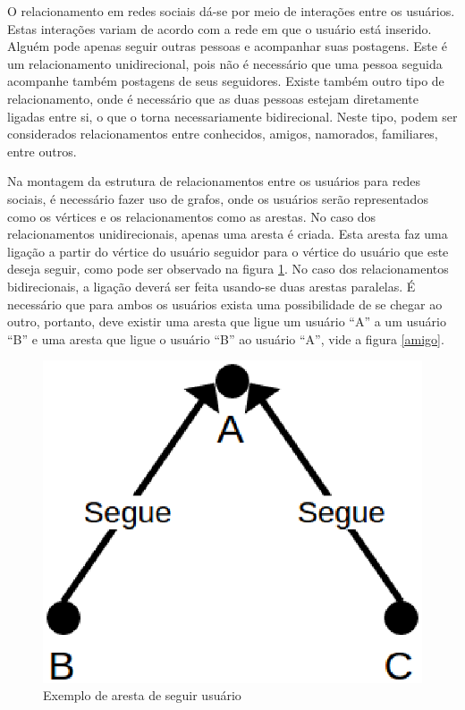 O relacionamento em redes sociais dá-se por meio de interações entre os usuários. Estas interações variam de acordo com a rede em que o usuário está inserido. Alguém pode apenas seguir outras pessoas e acompanhar suas postagens. Este é um relacionamento unidirecional, pois não é necessário que uma pessoa seguida acompanhe também postagens de seus seguidores. Existe também outro tipo de relacionamento, onde é necessário que as duas pessoas estejam diretamente ligadas entre si, o que o torna necessariamente bidirecional. Neste tipo, podem ser considerados relacionamentos entre conhecidos, amigos, namorados, familiares, entre outros.

Na montagem da estrutura de relacionamentos entre os usuários para redes sociais, é necessário fazer uso de grafos, onde os usuários serão representados como os vértices e os relacionamentos como as arestas. No caso dos relacionamentos unidirecionais, apenas uma aresta é criada. Esta aresta faz uma ligação a partir do vértice do usuário seguidor para o vértice do usuário que este deseja seguir, como pode ser observado na figura \ref{segue}. No caso dos relacionamentos bidirecionais, a ligação deverá ser feita usando-se duas arestas paralelas. É necessário que para ambos os usuários exista uma possibilidade de se chegar ao outro, portanto, deve existir uma aresta que ligue um usuário ``A'' a um usuário ``B'' e uma aresta que ligue o usuário ``B'' ao usuário ``A'', vide a figura \ref{amigo}.

\begin{figure}[!h]
	\centering
	\includegraphics[scale=0.45]{figuras/capitulo5/segue.eps}
	\caption{Exemplo de aresta de seguir usuário}
	\label{segue}
\end{figure}

